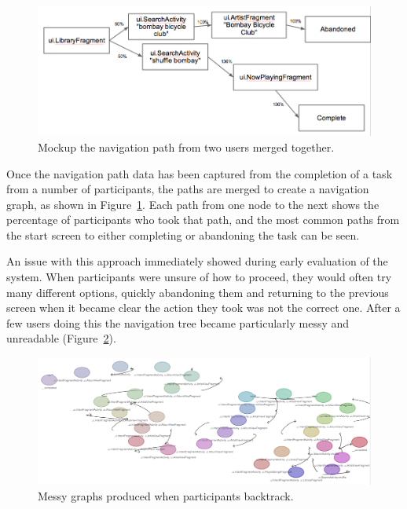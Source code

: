 \begin{figure}[h]
 \centering
 \includegraphics[width=\textwidth]{images/merged-paths}
 \caption{Mockup the navigation path from two users merged together.}
 \label{fig:task-navigation-tree}
\end{figure}

Once the navigation path data has been captured from the completion of a task from a number of participants, the paths are merged to create a navigation graph, as shown in Figure~\ref{fig:task-navigation-tree}. Each path from one node to the next shows the percentage of participants who took that path, and the most
common paths from the start screen to either completing or abandoning the task can be seen.

An issue with this approach immediately showed during early evaluation of the system. When participants were unsure of how to proceed, they would often try many different options, quickly abandoning them and returning to the previous screen when it became clear the action they took was not the correct one.
After a few users doing this the navigation tree became particularly messy and unreadable 
(Figure~\ref{fig:task-navigation-mess}).

\begin{figure}[h]
 \centering
 \includegraphics[width=\textwidth]{images/messy-graph}
 \caption{Messy graphs produced when participants backtrack.}
 \label{fig:task-navigation-mess}
\end{figure}

